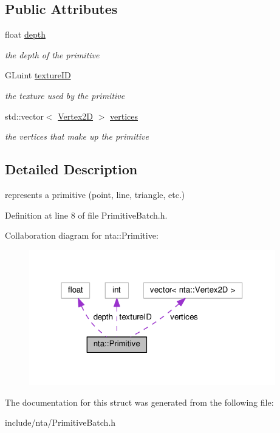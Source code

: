 \subsection*{Public Attributes}
\begin{DoxyCompactItemize}
\item 
\mbox{\label{structnta_1_1Primitive_a4443e427fb512898693bba61a8ac4654}} 
float \hyperlink{structnta_1_1Primitive_a4443e427fb512898693bba61a8ac4654}{depth}
\begin{DoxyCompactList}\small\item\em the depth of the primitive \end{DoxyCompactList}\item 
\mbox{\label{structnta_1_1Primitive_a203f519bb8fefeaae5253ef3739b7701}} 
G\+Luint \hyperlink{structnta_1_1Primitive_a203f519bb8fefeaae5253ef3739b7701}{texture\+ID}
\begin{DoxyCompactList}\small\item\em the texture used by the primitive \end{DoxyCompactList}\item 
\mbox{\label{structnta_1_1Primitive_a4fbc49e3dcd593551b6e65e59d842687}} 
std\+::vector$<$ \hyperlink{structnta_1_1Vertex2D}{Vertex2D} $>$ \hyperlink{structnta_1_1Primitive_a4fbc49e3dcd593551b6e65e59d842687}{vertices}
\begin{DoxyCompactList}\small\item\em the vertices that make up the primitive \end{DoxyCompactList}\end{DoxyCompactItemize}


\subsection{Detailed Description}
represents a primitive (point, line, triangle, etc.) 

Definition at line 8 of file Primitive\+Batch.\+h.



Collaboration diagram for nta\+:\+:Primitive\+:\nopagebreak
\begin{figure}[H]
\begin{center}
\leavevmode
\includegraphics[width=304pt]{d3/d08/structnta_1_1Primitive__coll__graph}
\end{center}
\end{figure}


The documentation for this struct was generated from the following file\+:\begin{DoxyCompactItemize}
\item 
include/nta/Primitive\+Batch.\+h\end{DoxyCompactItemize}
